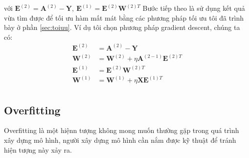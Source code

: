 \begin{enumerate}
với $\textbf{E}^{(2)} = \textbf{A}^{(2)}-\textbf{Y}, ~ \textbf{E}^{(1)} = \textbf{E}^{(2)}\textbf{W}^{(2)T}$
Bước tiếp theo là sử dụng kết quả vừa tìm được để tối ưu hàm mất mát bằng các phương pháp tối ưu tôi đã trình bày ở phần \ref{sec:toiuu}. Ví dụ tôi chọn phương pháp gradient descent, chúng ta có:
\begin{equation}
\begin{split}
\textbf{E}^{(2)} &= \textbf{A}^{(2)}-\textbf{Y}\\
\textbf{W}^{(2)} &=\textbf{W}^{(2)} + \eta \textbf{A}^{(2-1)}\textbf{E}^{(2)T} \\
 \textbf{E}^{(1)} &= \textbf{E}^{(2)}\textbf{W}^{(2)T}\\
\textbf{W}^{(1)} &= \textbf{W}^{(1)} + \eta \textbf{X}\textbf{E}^{(1)T}\\
\end{split}
\end{equation}


\end{enumerate}
\subsection{Overfitting}
\hspace{5mm} Overfitting là một hiệnn tượng không mong muốn thường gặp trong quá trình xây dựng mô hình, người xây dựng mô hình cần nắm được kỹ thuật để tránh hiện tượng này xảy ra.
